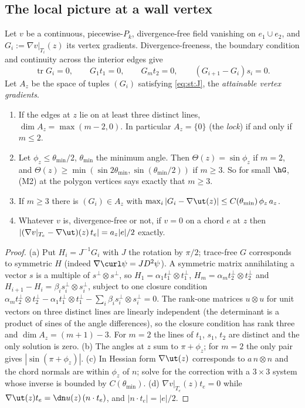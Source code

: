 \subsection{The local picture at a wall vertex}
Let $v$ be a continuous, piecewise-$P_k$, divergence-free field vanishing on $e_1\cup e_2$, and $G_i:=\nabla v|_{T_i}(z)$ its vertex gradients. Divergence-freeness, the boundary condition and continuity across the interior edges give
\begin{equation}\label{eq:st:J}
\operatorname{tr}G_i=0,\qquad G_1t_1=0,\qquad G_mt_2=0,\qquad (G_{i+1}-G_i)s_i=0 .
\end{equation}
Let $A_z$ be the space of tuples $(G_i)$ satisfying \eqref{eq:st:J}, the \emph{attainable vertex gradients}.

\begin{lemma}\label{lem:st:local}
\begin{enumerate}[label=(\alph*)]
\item If the edges at $z$ lie on at least three distinct lines, $\dim A_z=\max(m-2,0)$. In particular $A_z=\{0\}$ (the \emph{lock}) if and only if $m\le2$.
\item Let $\phi_z\le\theta_{\min}/2$, $\theta_{\min}$ the minimum angle. Then $\Theta(z)=\sin\phi_z$ if $m=2$, and $\Theta(z)\ge\min(\sin2\theta_{\min},\sin(\theta_{\min}/2))$ if $m\ge3$. So for small $\hG$, (M2) at the polygon vertices says exactly that $m\ge3$.
\item If $m\ge3$ there is $(G_i)\in A_z$ with $\max_i|G_i-\nabla\ut(z)|\le C(\theta_{\min})\,\phi_z\,a_z$.
\item Whatever $v$ is, divergence-free or not, if $v=0$ on a chord $e$ at $z$ then $|(\nabla v|_{T_e}-\nabla\ut)(z)\,t_e|=a_z|e|/2$ exactly.
\end{enumerate}
\end{lemma}

\begin{proof}
(a) Put $H_i=J^{-1}G_i$ with $J$ the rotation by $\pi/2$; trace-free $G$ corresponds to symmetric $H$ (indeed $\nabla\curl\psi=JD^2\psi$). A symmetric matrix annihilating a vector $s$ is a multiple of $s^\perp\otimes s^\perp$, so $H_1=\alpha_1t_1^\perp\otimes t_1^\perp$, $H_m=\alpha_mt_2^\perp\otimes t_2^\perp$ and $H_{i+1}-H_i=\beta_is_i^\perp\otimes s_i^\perp$, subject to one closure condition $\alpha_mt_2^\perp\otimes t_2^\perp-\alpha_1t_1^\perp\otimes t_1^\perp-\sum_i\beta_is_i^\perp\otimes s_i^\perp=0$. The rank-one matrices $u\otimes u$ for unit vectors on three distinct lines are linearly independent (the determinant is a product of sines of the angle differences), so the closure condition has rank three and $\dim A_z=(m+1)-3$. For $m=2$ the lines of $t_1$, $s_1$, $t_2$ are distinct and the only solution is zero. (b) The angles at $z$ sum to $\pi+\phi_z$; for $m=2$ the only pair gives $|\sin(\pi+\phi_z)|$. (c) In Hessian form $\nabla\ut(z)$ corresponds to $a\,n\otimes n$ and the chord normals are within $\phi_z$ of $n$; solve for the correction with a $3\times3$ system whose inverse is bounded by $C(\theta_{\min})$. (d) $\nabla v|_{T_e}(z)t_e=0$ while $\nabla\ut(z)t_e=\dn u(z)\,(n\cdot t_e)$, and $|n\cdot t_e|=|e|/2$.
\end{proof}

